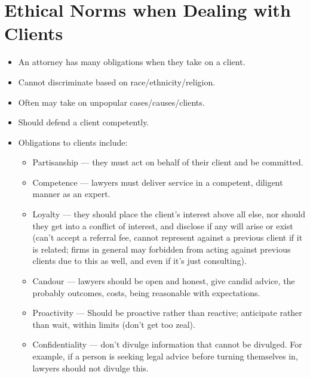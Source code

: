 \documentclass{article}
\begin{document}
\section{Ethical Norms when Dealing with Clients}
\begin{itemize}
    \item An attorney has many obligations when they take on a client.
    \item Cannot discriminate based on race/ethnicity/religion.
    \item Often may take on unpopular cases/causes/clients.
    \item Should defend a client competently.
    \item Obligations to clients include:
        \begin{itemize}
            \item Partisanship --- they must act on behalf of their client and be committed.
            \item Competence --- lawyers must deliver service in a competent, diligent manner as an expert.
            \item Loyalty --- they should place the client's interest above all else, nor should they get into a conflict of interest, and disclose if any will arise or exist (can't accept a referral fee, cannot represent against a previous client if it is related; firms in general may forbidden from acting against previous clients due to this as well, and even if it's just consulting).
            \item Candour --- lawyers should be open and honest, give candid advice, the probably outcomes, costs, being reasonable with expectations.
            \item Proactivity --- Should be proactive rather than reactive; anticipate rather than wait, within limits (don't get too zeal).
            \item Confidentiality --- don't divulge information that cannot be divulged.  For example, if a person is seeking legal advice before turning themselves in, lawyers should not divulge this.
        \end{itemize}
\end{itemize}
\end{document}
